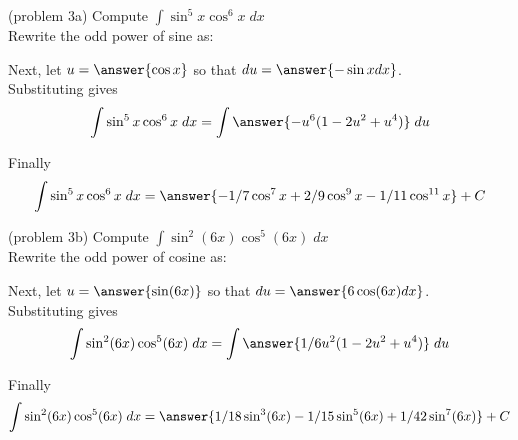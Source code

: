 \documentclass[handout]{ximera}
\begin{document}
\begin{problem}(problem 3a) 
Compute $\displaystyle{\int \sin^5 x\cos^6 x \; dx}$\\

Rewrite the odd power of sine as:

\begin{multipleChoice}
\end{multipleChoice}

Next, let $u = \answer{\cos x}$ so that $du = \answer{-\sin x dx}$.\\

Substituting gives
\[
\int \sin^5 x\cos^6 x \; dx= \int \answer{-u^6(1-2u^2 + u^4)} \; du
\]

Finally
\[
\int \sin^5 x\cos^6 x \; dx= \answer{-1/7 \cos^7 x + 2/9 \cos^9 x - 1/11 \cos^{11} x} + C
\]

\end{problem}



\begin{problem}{\color{gray}(problem 3b)} 
Compute $\displaystyle{\int \sin^2(6x)\cos^5(6x) \; dx}$\\

Rewrite the odd power of cosine as:

\begin{multipleChoice}
\end{multipleChoice}

Next, let $u = \answer{\sin(6x)}$ so that $du = \answer{6 \cos(6x) dx}$.\\

Substituting gives
\[
\int \sin^2(6x)\cos^5(6x) \; dx= \int \answer{1/6 u^2(1-2u^2 + u^4)} \; du
\]

Finally
\[
\int \sin^2(6x)\cos^5(6x) \; dx= \answer{1/18 \sin^3(6x) - 1/15 \sin^5(6x) + 1/42 \sin^7(6x)} + C
\]
\end{problem}
\end{document}
